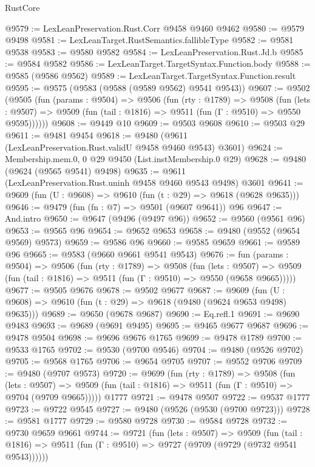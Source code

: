 \begin{lexlean}{RustCore}
\begin{coremodule}
@9579 := LexLeanPreservation.Rust.Corr @9458 @9460 @9462
@9580 := @9579 @9498
@9581 := LexLeanTarget.RustSemantics.fallibleType
@9582 := @9581 @9538
@9583 := @9580 @9582
@9584 := LexLeanPreservation.Rust.Jd.b
@9585 := @9584 @9582
@9586 := LexLeanTarget.TargetSyntax.Function.body
@9588 := @9585 (@9586 @9562)
@9589 := LexLeanTarget.TargetSyntax.Function.result
@9595 := @9575 (@9583 (@9588 (@9589 @9562) @9541 @9543))
@9607 := @9502
    (@9505
      (fun (params : @9504) =>
      @9506
        (fun (rty : @1789) =>
        @9508
          (fun (lets : @9507) =>
          @9509 (fun (tail : @1816) => @9511 (fun (Γ : @9510) => @9550 @9595))))))
@9608 := @9449 @10
@9609 := @9503 @9608
@9610 := @9503 @29
@9611 := @9481 @9454
@9618 := @9480 (@9611 (LexLeanPreservation.Rust.validU @9458 @9460 @9543) @3601)
@9624 := Membership.mem.{0, 0} @29 @9450 (List.instMembership.{0} @29)
@9628 := @9480 (@9624 (@9565 @9541) @9498)
@9635 := @9611 (LexLeanPreservation.Rust.uninh @9458 @9460 @9543 @9498) @3601
@9641 := @9609 (fun (U : @9608) => @9610 (fun (t : @29) => @9618 (@9628 @9635)))
@9646 := @9479 (fun (fn : @7) => @9501 (@9607 @9641)) @96
@9647 := And.intro
@9650 := @9647 (@9496 (@9497 @96))
@9652 := @9560 (@9561 @96)
@9653 := @9565 @96
@9654 := @9652 @9653
@9658 := @9480 (@9552 (@9654 @9569) @9573)
@9659 := @9586 @96
@9660 := @9585 @9659
@9661 := @9589 @96
@9665 := @9583 (@9660 @9661 @9541 @9543)
@9676 := fun (params : @9504) =>
  @9506
    (fun (rty : @1789) =>
    @9508
      (fun (lets : @9507) =>
      @9509 (fun (tail : @1816) => @9511 (fun (Γ : @9510) => @9550 (@9658 @9665)))))
@9677 := @9505 @9676
@9678 := @9502 @9677
@9687 := @9609 (fun (U : @9608) => @9610 (fun (t : @29) => @9618 (@9480 (@9624 @9653 @9498) @9635)))
@9689 := @9650 (@9678 @9687)
@9690 := Eq.refl.{1}
@9691 := @9690 @9483
@9693 := @9689 (@9691 @9495)
@9695 := @9465 @9677 @9687
@9696 := @9478 @9504
@9698 := @9696 @9676 @1765
@9699 := @9478 @1789
@9700 := @9533 @1765
@9702 := @9530 (@9700 @9546)
@9704 := @9480 (@9526 @9702)
@9705 := @9568 @1765
@9706 := @9654 @9705
@9707 := @9552 @9706
@9709 := @9480 (@9707 @9573)
@9720 := @9699
    (fun (rty : @1789) =>
    @9508
      (fun (lets : @9507) =>
      @9509 (fun (tail : @1816) => @9511 (fun (Γ : @9510) => @9704 (@9709 @9665)))))
    @1777
@9721 := @9478 @9507
@9722 := @9537 @1777
@9723 := @9722 @9545
@9727 := @9480 (@9526 (@9530 (@9700 @9723)))
@9728 := @9581 @1777
@9729 := @9580 @9728
@9730 := @9584 @9728
@9732 := @9730 @9659 @9661
@9744 := @9721
    (fun (lets : @9507) =>
    @9509
      (fun (tail : @1816) => @9511 (fun (Γ : @9510) => @9727 (@9709 (@9729 (@9732 @9541 @9543))))))

\end{coremodule}
\end{lexlean}
